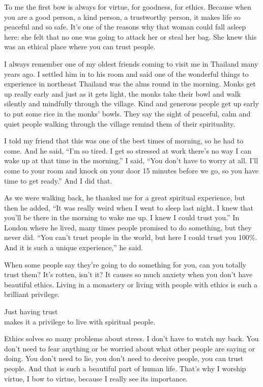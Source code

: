 \documentclass[12pt, openany]{book}
\newenvironment{aphorism}%
{%
\begin{center}\begin{itshape}
}%
{\end{itshape}\end{center}
}%
\begin{document}
To me the first bow is always for virtue, for goodness, for ethics. Because when you are a good person, a kind person, a trustworthy person, it makes life so peaceful and so safe. It’s one of the reasons why that woman could fall asleep here: she felt that no one was going to attack her or steal her bag. She knew this was an ethical place where you can trust people. 

I always remember one of my oldest friends coming to visit me in Thailand many years ago. I settled him in to his room and said one of the wonderful things to experience in northeast Thailand was the alms round in the morning. Monks get up really early and just as it gets light, the monks take their bowl and walk silently and mindfully through the village. Kind and generous people get up early to put some rice in the monks’ bowls. They say the sight of peaceful, calm and quiet people walking through the village remind them of their spirituality. 

I told my friend that this was one of the best times of morning, so he had to come. And he said, “I’m so tired. I get so stressed at work there’s no way I can wake up at that time in the morning.” I said, “You don’t have to worry at all. I’ll come to your room and knock on your door 15 minutes before we go, so you have time to get ready.” And I did that. 

As we were walking back, he thanked me for a great spiritual experience, but then he added, “It was really weird when I went to sleep last night. I knew that you’ll be there in the morning to wake me up. I knew I could trust you.” In London where he lived, many times people promised to do something, but they never did. “You can’t trust people in the world, but here I could trust you 100\%. And it is such a unique experience,” he said. 

When some people say they’re going to do something for you, can you totally trust them? It’s rotten, isn’t it? It causes so much anxiety when you don’t have beautiful ethics. Living in a monastery or living with people with ethics is such a brilliant privilege. 

\begin{aphorism}
Just having trust\\  
makes it a privilege to live with spiritual people.
\end{aphorism}

Ethics solves so many problems about stress. I don’t have to watch my back. You don’t need to fear anything or be worried about what other people are saying or doing. You don’t need to lie, you don’t need to deceive people, you can trust people. And that is such a beautiful part of human life. That’s why I worship virtue, I bow to virtue, because I really see its importance. 
\end{document}
